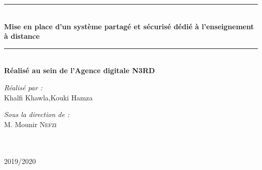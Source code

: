 \begin{titlepage}
\begin{center}
\rule{\linewidth}{0.3mm} \\[0.4cm]
{ \huge \bfseries\color{blue!70!black} Mise en place d'un système partagé et sécurisé
	dédié à l’enseignement à distance \\[0.4cm] }
\rule{\linewidth}{0.3mm} \\[0.4cm]
{\large \bfseries Réalisé au sein de l'Agence digitale N3RD}\\[0.5cm]
 \noindent
\begin{minipage}{0.4\textwidth}
  \begin{flushleft} \large
    \emph{\color{orange!80!black}Réalisé par :}\\
    Khalfi Khawla,Kouki Hamza \\
  \end{flushleft}
\end{minipage}%
\begin{minipage}{0.5\textwidth}
  \begin{flushright} \large
    \emph{\color{orange!80!black}Sous la direction de :} \\
    M. Mounir \textsc{Nefzi} \\
  \end{flushright}
\end{minipage}\\[4cm]





{\large \color{orange!80!black}{Année universitaire}\\ \color{blue!80!black}2019/2020}

\end{center}
\end{titlepage}
